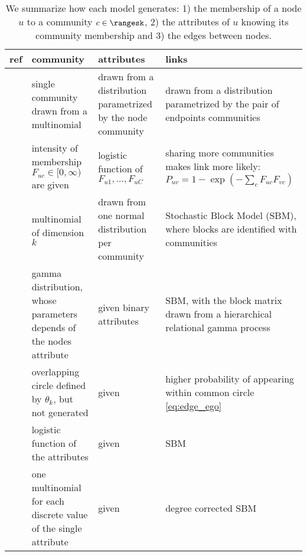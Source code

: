 \setlength{\fullpage}{\textwidth+\marginparsep+\marginparwidth}
\begin{table}[htpb]
  \centering
  \small
  \caption{We summarize how each model generates: 1) the membership of a node $u$ to a community $c
  \in \rangesk$, 2) the attributes of $u$ knowing its community membership and 3) the edges between
nodes.}
  \label{tab:edge_genmodel}
  \bgroup
  \def\arraystretch{1.5}
  \begin{tabulary}{\fullpage}{LLLL}
    \toprule
    ref & community & attributes & links \\
    \midrule

    \autocite{Xu2014} &
    single community drawn from a multinomial &
    drawn from a distribution parametrized by the node community &
    drawn from a distribution parametrized by the pair of endpoints communities \\

    \autocite{Yang2013} &
    intensity of membership $F_{uc} \in [0, \infty)$ are given &
    logistic function of $F_{u1},\ldots,F_{uC}$ &
    sharing more communities makes link more likely:
    $P_{uv} = 1-\exp(-\sum_c F_{uc}F_{vc})$ \\

    \autocite{Kataoka2016} &
    multinomial of dimension $k$ &
    drawn from one normal distribution per community &
    Stochastic Block Model (SBM), where blocks are identified with communities \\

    \midrule

    \autocite{Zhao2017} &
    gamma distribution, whose parameters depends of the nodes attribute &
    given binary attributes &
    SBM, with the block matrix drawn from a hierarchical relational gamma process \\

    \autocites{LeskovecEgo12}{LeskovecEgo14} &
    overlapping circle defined by $\theta_k$, but not generated &
    given &
    higher probability of appearing within common circle \eqref{eq:edge_ego} \\

    \autocite{Weng2016} &
    logistic function of the attributes &
    given &
    SBM \\

    \autocite{Newman2016} &
    one multinomial for each discrete value of the single attribute &
    given &
    degree corrected SBM \\
    \bottomrule
  \end{tabulary}
  \egroup
\end{table}

